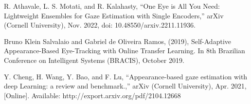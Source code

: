 \documentclass[conference]{IEEEtran}
\begin{document}
\begin{thebibliography}{00}
R. Athavale, L. S. Motati, and R. Kalahasty, “One Eye is All You Need: Lightweight Ensembles for Gaze Estimation with  Single Encoders,” arXiv (Cornell University), Nov. 2022, doi: 10.48550/arxiv.2211.11936.

Bruno Klein Salvalaio and Gabriel de Oliveira Ramos, (2019), Self-Adaptive Appearance-Based Eye-Tracking with Online Transfer Learning. In 8th Brazilian Conference on Intelligent Systems (BRACIS), October 2019.

Y. Cheng, H. Wang, Y. Bao, and F. Lu, “Appearance-based gaze estimation with deep Learning: a review and benchmark.,” arXiv (Cornell University), Apr. 2021, [Online]. Available: http://export.arxiv.org/pdf/2104.12668

 
\end{thebibliography}
\vspace{12pt}
\end{document}
